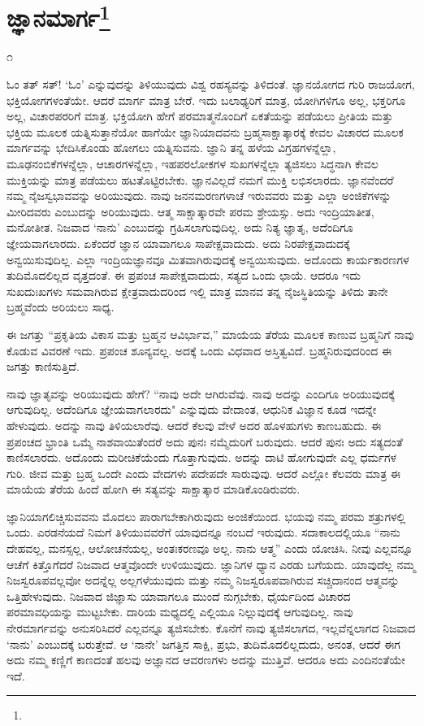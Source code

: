 
\chapter[ಜ್ಞಾನಮಾರ್ಗ]{ಜ್ಞಾನಮಾರ್ಗ\protect\footnote{}}

\begin{center}
೧
\end{center}

ಓಂ ತತ್ ಸತ್! `ಓಂ' ಎನ್ನುವುದನ್ನು ತಿಳಿಯುವುದು ವಿಶ್ವ ರಹಸ್ಯವನ್ನು ತಿಳಿದಂತೆ. ಜ್ಞಾನಯೋಗದ ಗುರಿ ರಾಜಯೋಗ, ಭಕ್ತಿಯೋಗಗಳಂತೆಯೇ. ಆದರೆ ಮಾರ್ಗ ಮಾತ್ರ ಬೇರೆ. ಇದು ಬಲಾಢ್ಯರಿಗೆ ಮಾತ್ರ, ಯೋಗಿಗಳಿಗೂ ಅಲ್ಲ, ಭಕ್ತರಿಗೂ ಅಲ್ಲ, ವಿಚಾರಪರರಿಗೆ ಮಾತ್ರ. ಭಕ್ತಿಯೋಗಿ ಹೇಗೆ ಪರಮಾತ್ಮನೊಂದಿಗೆ ಏಕತೆಯನ್ನು ಪಡೆಯಲು ಪ್ರೀತಿಯ ಮತ್ತು ಭಕ್ತಿಯ ಮೂಲಕ ಯತ್ನಿಸುತ್ತಾನೆಯೋ ಹಾಗೆಯೇ ಜ್ಞಾನಿಯಾದವನು ಬ್ರಹ್ಮಸಾಕ್ಷಾತ್ಕಾರಕ್ಕೆ ಕೇವಲ ವಿಚಾರದ ಮೂಲಕ ಮಾರ್ಗವನ್ನು ಭೇದಿಸಿಕೊಂಡು ಹೋಗಲು ಯತ್ನಿಸುವನು. ಜ್ಞಾನಿ ತನ್ನ ಹಳೆಯ ವಿಗ್ರಹಗಳನ್ನೆಲ್ಲಾ, ಮೂಢನಂಬಿಕೆಗಳನ್ನೆಲ್ಲಾ, ಆಚಾರಗಳನ್ನೆಲ್ಲಾ, ಇಹಪರಲೋಕಗಳ ಸುಖಗಳನ್ನೆಲ್ಲಾ ತ್ಯಜಿಸಲು ಸಿದ್ಧನಾಗಿ ಕೇವಲ ಮುಕ್ತಿಯನ್ನು ಮಾತ್ರ ಪಡೆಯಲು ಹಟತೊಟ್ಟಿರಬೇಕು. ಜ್ಞಾನವಿಲ್ಲದೆ ನಮಗೆ ಮುಕ್ತಿ ಲಭಿಸಲಾರದು. ಜ್ಞಾನವೆಂದರೆ ನಮ್ಮ ನೈಜಸ್ವಭಾವವನ್ನು ಅರಿಯುವುದು. ನಾವು ಜನನಮರಣಗಳಾಚೆ ಇರುವವರು ಮತ್ತು ಎಲ್ಲಾ ಅಂಜಿಕೆಗಳನ್ನು ಮೀರಿದವರು ಎಂಬುದನ್ನು ಅರಿಯುವುದು. ಆತ್ಮ ಸಾಕ್ಷಾತ್ಕಾರವೇ ಪರಮ ಶ್ರೇಯಸ್ಸು. ಅದು ಇಂದ್ರಿಯಾತೀತ, ಮನೋತೀತ. ನಿಜವಾದ `ನಾನು' ಎಂಬುದನ್ನು ಗ್ರಹಿಸಲಾಗುವುದಿಲ್ಲ. ಅದು ನಿತ್ಯ ಜ್ಞಾತೃ, ಅದೆಂದಿಗೂ ಜ್ಞೇಯವಾಗಲಾರದು. ಏಕೆಂದರೆ ಜ್ಞಾನ ಯಾವಾಗಲೂ ಸಾಪೇಕ್ಷವಾದುದು. ಅದು ನಿರಪೇಕ್ಷವಾದುದಕ್ಕೆ ಅನ್ವಯಿಸುವುದಿಲ್ಲ. ಎಲ್ಲಾ ಇಂದ್ರಿಯಜ್ಞಾನವೂ ಮಿತವಾಗಿರುವುದಕ್ಕೆ ಅನ್ವಯಿಸುವುದು. ಅದೊಂದು ಕಾರ್ಯಕಾರಣಗಳ ತುದಿಮೊದಲಿಲ್ಲದ ವೃತ್ತದಂತೆ. ಈ ಪ್ರಪಂಚ ಸಾಪೇಕ್ಷವಾದುದು, ಸತ್ಯದ ಒಂದು ಛಾಯೆ. ಆದರೂ ಇದು ಸುಖದುಃಖಗಳು ಸಮವಾಗಿರುವ ಕ್ಷೇತ್ರವಾದುದರಿಂದ ಇಲ್ಲಿ ಮಾತ್ರ ಮಾನವ ತನ್ನ ನೈಜಸ್ಥಿತಿಯನ್ನು ತಿಳಿದು ತಾನೇ ಬ್ರಹ್ಮವೆಂದು ಅರಿಯಲು ಸಾಧ್ಯ.

ಈ ಜಗತ್ತು “ಪ್ರಕೃತಿಯ ವಿಕಾಸ ಮತ್ತು ಬ್ರಹ್ಮನ ಆವಿರ್ಭಾವ,'' ಮಾಯೆಯ ತೆರೆಯ ಮೂಲಕ ಕಾಣುವ ಬ್ರಹ್ಮನಿಗೆ ನಾವು ಕೊಡುವ ವಿವರಣೆ ಇದು. ಪ್ರಪಂಚ ಶೂನ್ಯವಲ್ಲ. ಅದಕ್ಕೆ ಒಂದು ವಿಧವಾದ ಅಸ್ತಿತ್ವವಿದೆ. ಬ್ರಹ್ಮನಿರುವುದರಿಂದ ಈ ಜಗತ್ತು ಕಾಣಿಸುತ್ತಿದೆ.

ನಾವು ಜ್ಞಾತೃವನ್ನು ಅರಿಯುವುದು ಹೇಗೆ? “ನಾವು ಅದೇ ಆಗಿರುವೆವು. ನಾವು ಅದನ್ನು ಎಂದಿಗೂ ಅರಿಯುವುದಕ್ಕೆ ಆಗುವುದಿಲ್ಲ. ಅದೆಂದಿಗೂ ಜ್ಞೇಯವಾಗಲಾರದು" ಎನ್ನುವುದು ವೇದಾಂತ, ಆಧುನಿಕ ವಿಜ್ಞಾನ ಕೂಡ ಇದನ್ನೇ ಹೇಳುವುದು. ಅದನ್ನು ನಾವು ತಿಳಿಯಲಾರೆವು. ಆದರೆ ಕೆಲವು ವೇಳೆ ಅದರ ಹೊಳಹುಗಳು ಕಾಣಬಹುದು. ಈ ಪ್ರಪಂಚದ ಭ್ರಾಂತಿ ಒಮ್ಮೆ ನಾಶವಾಯಿತೆಂದರೆ ಅದು ಪುನಃ ನಮ್ಮೆದುರಿಗೆ ಬರುವುದು. ಆದರೆ ಪುನಃ ಅದು ಸತ್ಯದಂತೆ ಕಾಣಿಸಲಾರದು. ಅದೊಂದು ಮರೀಚಿಕೆಯೆಂದು ಗೊತ್ತಾಗುವುದು. ಅದನ್ನು ದಾಟಿ ಹೋಗುವುದೇ ಎಲ್ಲ ಧರ್ಮಗಳ ಗುರಿ. ಜೀವ ಮತ್ತು ಬ್ರಹ್ಮ ಒಂದೇ ಎಂದು ವೇದಗಳು ಪದೇಪದೇ ಸಾರುವುವು. ಆದರೆ ಎಲ್ಲೋ ಕೆಲವರು ಮಾತ್ರ ಈ ಮಾಯೆಯ ತೆರೆಯ ಹಿಂದೆ ಹೋಗಿ ಈ ಸತ್ಯವನ್ನು ಸಾಕ್ಷಾತ್ಕಾರ ಮಾಡಿಕೊಂಡಿರುವರು.

ಜ್ಞಾನಿಯಾಗಲಿಚ್ಚಿಸುವವನು ಮೊದಲು ಪಾರಾಗಬೇಕಾಗಿರುವುದು ಅಂಜಿಕೆಯಿಂದ. ಭಯವು ನಮ್ಮ ಪರಮ ಶತ್ರುಗಳಲ್ಲಿ ಒಂದು. ಎರಡನೆಯದೆ ನಿಮಗೆ ತಿಳಿಯುವವರೆಗೆ ಯಾವುದನ್ನೂ ನಂಬದೆ ಇರುವುದು. ಸದಾಕಾಲದಲ್ಲಿಯೂ “ನಾನು ದೇಹವಲ್ಲ, ಮನಸ್ಸಲ್ಲ, ಆಲೋಚನೆಯಲ್ಲ, ಅಂತಃಕರಣವೂ ಅಲ್ಲ. ನಾನು ಆತ್ಮ” ಎಂದು ಯೋಚಿಸಿ. ನೀವು ಎಲ್ಲವನ್ನೂ ಆಚೆಗೆ ಕಿತ್ತೊಗೆದರೆ ನಿಜವಾದ ಆತ್ಮವೊಂದೇ ಉಳಿಯುವುದು. ಜ್ಞಾನಿಗಳ ಧ್ಯಾನ ಎರಡು ಬಗೆಯದು. ಯಾವುದೆಲ್ಲ ನಮ್ಮ ನಿಜಸ್ವರೂಪವಲ್ಲವೋ ಅದನ್ನೆಲ್ಲ ಅಲ್ಲಗಳೆಯುವುದು ಮತ್ತು ನಮ್ಮ ನಿಜಸ್ವರೂಪವಾಗಿರುವ ಸಚ್ಚಿದಾನಂದ ಆತ್ಮವನ್ನು ಒತ್ತಿಹೇಳುವುದು. ನಿಜವಾದ ಜಿಜ್ಞಾಸು ಯಾವಾಗಲೂ ಮುಂದೆ ನುಗ್ಗಬೇಕು, ಧೈರ್ಯದಿಂದ ವಿಚಾರದ ಪರಮಾವಧಿಯನ್ನು ಮುಟ್ಟಬೇಕು. ದಾರಿಯ ಮಧ್ಯದಲ್ಲಿ ಎಲ್ಲಿಯೂ ನಿಲ್ಲುವುದಕ್ಕೆ ಆಗುವುದಿಲ್ಲ. ನಾವು ನೇರಮಾರ್ಗವನ್ನು ಅನುಸರಿಸಿದರೆ ಎಲ್ಲವನ್ನೂ ತ್ಯಜಿಸಬೇಕು. ಕೊನೆಗೆ ನಾವು ತ್ಯಜಿಸಲಾಗದ, ಇಲ್ಲವೆನ್ನಲಾಗದ ನಿಜವಾದ `ನಾನು' ಎಂಬುದಕ್ಕೆ ಬರುತ್ತೇವೆ. ಆ `ನಾನೇ' ಜಗತ್ತಿನ ಸಾಕ್ಷಿ, ಪ್ರಭು, ತುದಿಮೊದಲಿಲ್ಲದುದು, ಅನಂತ, ಆದರೆ ಈಗ ಅದು ನಮ್ಮ ಕಣ್ಣಿಗೆ ಕಾಣದಂತೆ ಹಲವು ಅಜ್ಞಾನದ ಆವರಣಗಳು ಅದನ್ನು ಮುತ್ತಿವೆ. ಆದರೂ ಅದು ಎಂದಿನಂತೆಯೇ ಇದೆ.

